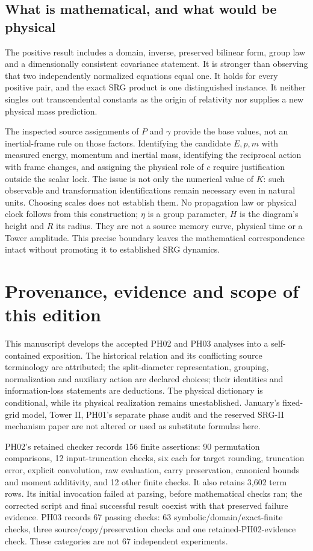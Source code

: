 \documentclass[11pt,a4paper]{article}
\begin{document}
\subsection{What is mathematical, and what would be physical}
The positive result includes a domain, inverse, preserved bilinear form, group law and a dimensionally consistent covariance statement. It is stronger than observing that two independently normalized equations equal one. It holds for every positive pair, and the exact SRG product is one distinguished instance. It neither singles out transcendental constants as the origin of relativity nor supplies a new physical mass prediction.

The inspected source assignments of $P$ and $\gamma$ provide the base values, not an inertial-frame rule on those factors. Identifying the candidate $E,p,m$ with measured energy, momentum and inertial mass, identifying the reciprocal action with frame changes, and assigning the physical role of $c$ require justification outside the scalar lock. The issue is not only the numerical value of $K$: such observable and transformation identifications remain necessary even in natural units. Choosing scales does not establish them. No propagation law or physical clock follows from this construction; $\eta$ is a group parameter, $H$ is the diagram's height and $R$ its radius. They are not a source memory curve, physical time or a Tower amplitude. This precise boundary leaves the mathematical correspondence intact without promoting it to established SRG dynamics.

\section{Provenance, evidence and scope of this edition}
\label{sec:evidence}
This manuscript develops the accepted PH02 and PH03 analyses into a self-contained exposition. The historical relation and its conflicting source terminology are attributed; the split-diameter representation, grouping, normalization and auxiliary action are declared choices; their identities and information-loss statements are deductions. The physical dictionary is conditional, while its physical realization remains unestablished. January's fixed-grid model, Tower II, PH01's separate phase audit and the reserved SRG-II mechanism paper are not altered or used as substitute formulas here.

PH02's retained checker records 156 finite assertions: 90 permutation comparisons, 12 input-truncation checks, six each for target rounding, truncation error, explicit convolution, raw evaluation, carry preservation, canonical bounds and moment additivity, and 12 other finite checks. It also retains 3,602 term rows. Its initial invocation failed at parsing, before mathematical checks ran; the corrected script and final successful result coexist with that preserved failure evidence. PH03 records 67 passing checks: 63 symbolic/domain/exact-finite checks, three source/copy/preservation checks and one retained-PH02-evidence check. These categories are not 67 independent experiments.
\end{document}
